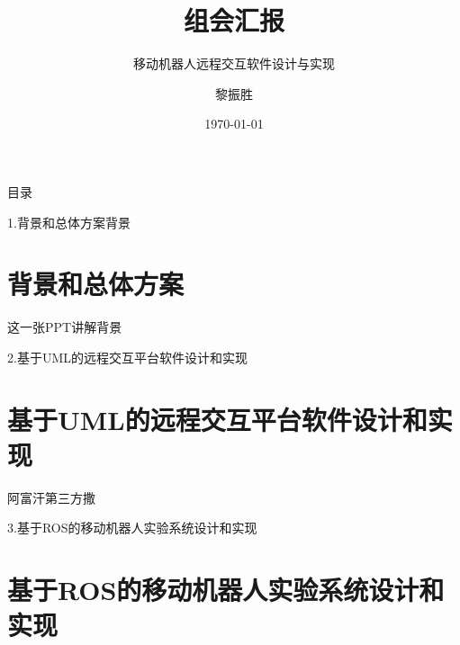 \documentclass{beamer}
\title{组会汇报}
\subtitle{移动机器人远程交互软件设计与实现}
\institute{中南大学机电工程学院}
\author{黎振胜}
\date{\today}
\begin{document}
\begin{frame}
\maketitle
\end{frame}
\begin{frame}[t]{目录}
 \tableofcontents[pausesections]
\end{frame}
\begin{frame}[t]{1.背景和总体方案}{背景}
    \section{背景和总体方案}
    这一张PPT讲解背景
\end{frame}
\begin{frame}[t]{2.基于UML的远程交互平台软件设计和实现}
    \section{基于UML的远程交互平台软件设计和实现}
    阿富汗第三方撒
\end{frame}
\begin{frame}[t]{3.基于ROS的移动机器人实验系统设计和实现}
    \section{基于ROS的移动机器人实验系统设计和实现}
\end{frame}
\end{document}
